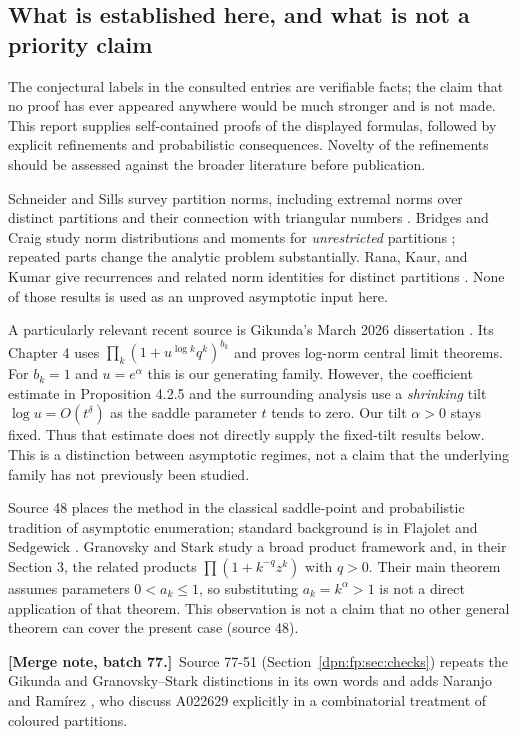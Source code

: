 \documentclass[11pt]{article}
\numberwithin{equation}{section}
\theoremstyle{definition}\newtheorem{definition}[theorem]{Definition}
\theoremstyle{remark}\newtheorem{remark}[theorem]{Remark}
\newcommand{\src}[1]{\textup{(source #1)}}
\newcommand{\mergenotec}[1]{\par\smallskip\noindent\textbf{[Merge note, batch 77.]}\ #1\par\smallskip}
\begin{document}
\subsection{What is established here, and what is not a priority claim}
The conjectural labels in the consulted entries are verifiable facts; the claim
that no proof has ever appeared anywhere would be much stronger and is not made.
This report supplies self-contained proofs of the displayed formulas, followed
by explicit refinements and probabilistic consequences. Novelty of the
refinements should be assessed against the broader literature before publication.

Schneider and Sills survey partition norms, including extremal norms over
distinct partitions and their connection with triangular numbers
\cite{schneider}. Bridges and Craig study norm distributions and moments for
\emph{unrestricted} partitions \cite{bridges}; repeated parts change the
analytic problem substantially. Rana, Kaur, and Kumar give recurrences and
related norm identities for distinct partitions \cite{rana}. None of those
results is used as an unproved asymptotic input here.

A particularly relevant recent source is Gikunda's March 2026 dissertation
\cite{gikunda}. Its Chapter 4 uses
$\prod_k(1+u^{\log k}q^k)^{b_k}$ and proves log-norm central limit theorems.
For $b_k=1$ and $u=e^\alpha$ this is our generating family. However, the
coefficient estimate in Proposition 4.2.5 and the surrounding analysis use a
\emph{shrinking} tilt $\log u=O(t^\delta)$ as the saddle parameter $t$ tends
to zero. Our tilt $\alpha>0$ stays fixed. Thus that estimate does not directly
supply the fixed-tilt results below. This is a distinction between asymptotic
regimes, not a claim that the underlying family has not previously been studied.

Source 48 places the method in the classical saddle-point and probabilistic
tradition of asymptotic enumeration; standard background is in Flajolet and
Sedgewick \cite{FS}.  Granovsky and Stark \cite{GS} study a broad product
framework and, in their Section 3, the related products
$\prod(1+k^{-q}z^k)$ with $q>0$.  Their main theorem assumes parameters
$0<a_k\le1$, so substituting $a_k=k^\alpha>1$ is not a direct application of
that theorem.  This observation is not a claim that no other general theorem
can cover the present case \src{48}.
\mergenotec{Source 77-51 (Section~\ref{dpn:fp:sec:checks}) repeats the Gikunda
and Granovsky--Stark distinctions in its own words and adds Naranjo and
Ram\'irez \cite{NR}, who discuss A022629 explicitly in a combinatorial
treatment of coloured partitions.}
\end{document}

